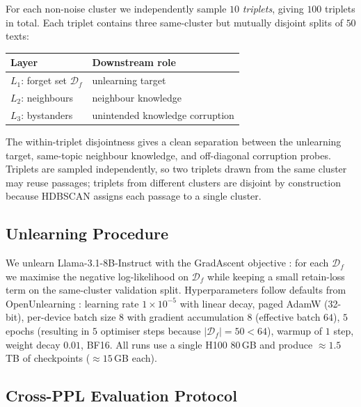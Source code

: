 \documentclass[11pt]{article}
\newcommand{\Df}{\mathcal{D}_f}
\newcommand{\Lone}{L_1}
\newcommand{\Ltwo}{L_2}
\newcommand{\Lthree}{L_3}
\begin{document}
For each non-noise cluster we independently sample $10$ \emph{triplets}, giving
$100$ triplets in total. Each triplet contains three same-cluster but mutually
disjoint splits of $50$ texts:
\begin{center}
\small
\begin{tabular}{@{}ll@{}}
    \toprule
    Layer & Downstream role \\
    \midrule
    $\Lone$: forget set $\Df$ & unlearning target \\
    $\Ltwo$: neighbours       & neighbour knowledge \\
    $\Lthree$: bystanders     & unintended knowledge corruption \\
    \bottomrule
\end{tabular}
\end{center}
The within-triplet disjointness gives a clean separation between the unlearning
target, same-topic neighbour knowledge, and off-diagonal corruption probes. Triplets are sampled independently, so
two triplets drawn from the same cluster may reuse passages; triplets from
different clusters are disjoint by construction because HDBSCAN assigns each
passage to a single cluster.

\subsection{Unlearning Procedure}
\label{sec:unlearn}

We unlearn Llama-3.1-8B-Instruct \citep{dubey2024llama3} with the GradAscent objective \citep{jang2023knowledge}: for each $\Df$ we maximise the negative log-likelihood on $\Df$ while keeping a small retain-loss term on the same-cluster validation split. Hyperparameters follow defaults from OpenUnlearning \citep{dorna2025openunlearning}: learning rate $1\!\times\!10^{-5}$ with linear decay, paged AdamW (32-bit), per-device batch size $8$ with gradient accumulation $8$ (effective batch $64$), $5$ epochs (resulting in $5$ optimiser steps because $|\Df|{=}50<64$), warmup of $1$ step, weight decay $0.01$, BF16. All runs use a single H100 80\,GB and produce $\approx 1.5$\,TB of checkpoints ($\approx 15$\,GB each).

\subsection{Cross-PPL Evaluation Protocol}
\label{sec:matrix}
\end{document}

